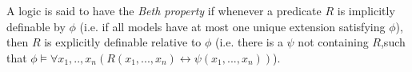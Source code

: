 \documentclass[12pt]{article}
\begin{document}
A logic is said to have the \emph{Beth property} if whenever a predicate $R$ is implicitly definable by $\phi$ (i.e. if all models have at most one unique extension satisfying $\phi$), then $R$ is explicitly definable relative to $\phi$ (i.e. there is a $\psi$ not containing $R$,such that $\phi \models \forall x_1, .., x_n (R(x_1,...,x_n) \leftrightarrow \psi(x_1,...,x_n))$).
\end{document}
